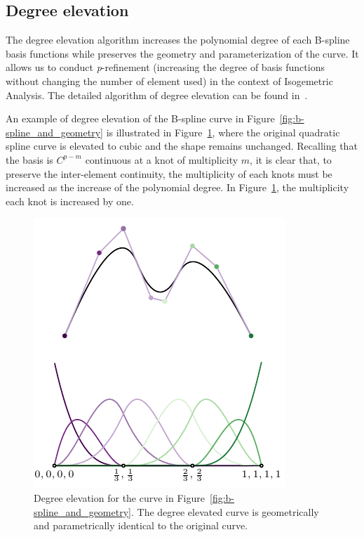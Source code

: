 \subsection{Degree elevation}

The degree elevation algorithm increases the polynomial degree of each B-spline basis functions while preserves the geometry and parameterization of the curve. It allows us to conduct \textit{p}-refinement (increasing the degree of basis functions without changing the number of element used) in the context of Isogemetric Analysis. The detailed algorithm of degree elevation can be found in~\cite{piegl2012nurbs}.

An example of degree elevation of the B-spline curve in Figure~\ref{fig:b-spline_and_geometry} is illustrated in Figure~\ref{fig:b-spline_p_refine}, where the original quadratic spline curve is elevated to cubic and the shape remains unchanged. Recalling that the basis is $C^{p-m}$ continuous at a knot of multiplicity $m$, it is clear that, to preserve the inter-element continuity, the multiplicity of each knots must be increased as the increase of the polynomial degree. In Figure~\ref{fig:b-spline_p_refine}, the multiplicity each knot is increased by one.

\begin{figure}[ht]
    \center\includegraphics[scale=1.3]{p_refine}
    \caption{Degree elevation for the curve in Figure~\ref{fig:b-spline_and_geometry}. The degree elevated curve is geometrically and parametrically identical to the original curve.}\label{fig:b-spline_p_refine}
\end{figure}

